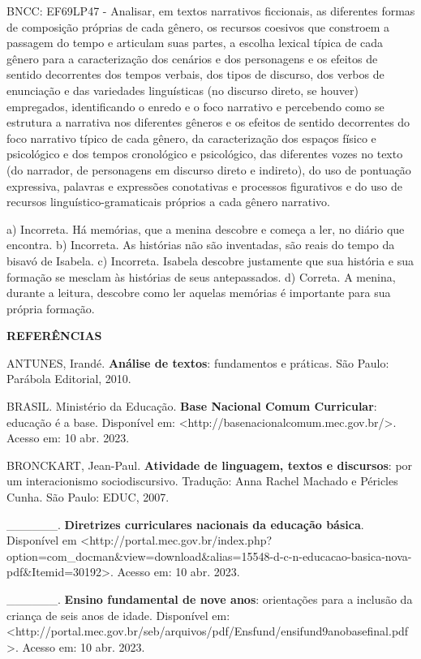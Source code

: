 \begin{escolha}
\begin{escolha}
\begin{escolha}
\begin{escolha}
\begin{escolha}
\begin{escolha}
\begin{escolha}
\begin{escolha}
\begin{escolha}
\begin{escolha}
\begin{escolha}
\begin{escolha}
\begin{escolha}
\begin{escolha}
\begin{escolha}
BNCC: EF69LP47 - Analisar, em textos narrativos ficcionais, as
diferentes formas de composição próprias de cada gênero, os recursos
coesivos que constroem a passagem do tempo e articulam suas partes, a
escolha lexical típica de cada gênero para a caracterização dos cenários
e dos personagens e os efeitos de sentido decorrentes dos tempos
verbais, dos tipos de discurso, dos verbos de enunciação e das
variedades linguísticas (no discurso direto, se houver) empregados,
identificando o enredo e o foco narrativo e percebendo como se estrutura
a narrativa nos diferentes gêneros e os efeitos de sentido decorrentes
do foco narrativo típico de cada gênero, da caracterização dos espaços
físico e psicológico e dos tempos cronológico e psicológico, das
diferentes vozes no texto (do narrador, de personagens em discurso
direto e indireto), do uso de pontuação expressiva, palavras e
expressões conotativas e processos figurativos e do uso de recursos
linguístico-gramaticais próprios a cada gênero narrativo.

a) Incorreta. Há memórias, que a menina descobre e começa a ler, no
diário que encontra. b) Incorreta. As histórias não são inventadas, são
reais do tempo da bisavó de Isabela. c) Incorreta. Isabela descobre
justamente que sua história e sua formação se mesclam às histórias de
seus antepassados. d) Correta. A menina, durante a leitura, descobre
como ler aquelas memórias é importante para sua própria formação.

\textbf{REFERÊNCIAS}

ANTUNES, Irandé. \textbf{Análise de textos}: fundamentos e práticas. São
Paulo: Parábola Editorial, 2010.

BRASIL. Ministério da Educação. \textbf{Base Nacional Comum Curricular}:
educação é a base. Disponível em:
\textless{}http://basenacionalcomum.mec.gov.br/\textgreater{}. Acesso
em: 10 abr. 2023.

BRONCKART, Jean-Paul. \textbf{Atividade de linguagem, textos e
discursos}: por um interacionismo sociodiscursivo. Tradução: Anna Rachel
Machado e Péricles Cunha. São Paulo: EDUC, 2007.

\_\_\_\_\_\_. \textbf{Diretrizes curriculares nacionais da educação
básica}. Disponível em
\textless{}http://portal.mec.gov.br/index.php?option=com\_docman\&view=download\&alias=15548-d-c-n-educacao-basica-nova-pdf\&Itemid=30192\textgreater{}.
Acesso em: 10 abr. 2023.

\_\_\_\_\_\_. \textbf{Ensino fundamental de nove anos}: orientações para
a inclusão da criança de seis anos de idade. Disponível em:
\textless{}http://portal.mec.gov.br/seb/arquivos/pdf/Ensfund/ensifund9anobasefinal.pdf\textgreater{}.
Acesso em: 10 abr. 2023.


\end{escolha}
\end{escolha}
\end{escolha}
\end{escolha}
\end{escolha}
\end{escolha}
\end{escolha}
\end{escolha}
\end{escolha}
\end{escolha}
\end{escolha}
\end{escolha}
\end{escolha}
\end{escolha}
\end{escolha}
